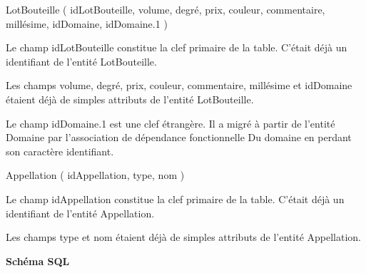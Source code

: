 \documentclass[11pt]{article}
\begin{document}
{LotBouteille} ( {idLotBouteille}, {volume}, {degré}, {prix}, {couleur},
{commentaire}, {millésime}, {idDomaine}, {idDomaine.1} )

Le champ idLotBouteille constitue la clef primaire de la table. C'était
déjà un identifiant de l'entité LotBouteille.

Les champs volume, degré, prix, couleur, commentaire, millésime et
idDomaine étaient déjà de simples attributs de l'entité LotBouteille.

Le champ idDomaine.1 est une clef étrangère. Il a migré à partir de
l'entité Domaine par l'association de dépendance fonctionnelle Du
domaine en perdant son caractère identifiant.

{Appellation} ( {idAppellation}, {type}, {nom} )

Le champ idAppellation constitue la clef primaire de la table. C'était
déjà un identifiant de l'entité Appellation.

Les champs type et nom étaient déjà de simples attributs de l'entité
Appellation.

\textbf{Schéma SQL}
\end{document}
